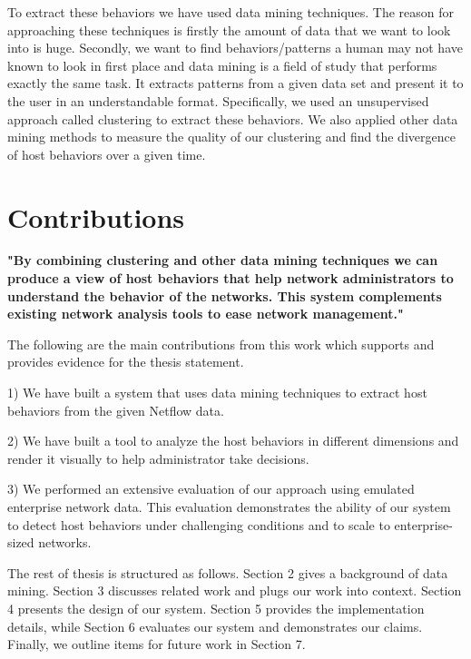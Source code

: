 To extract these behaviors we have used data mining techniques. The reason for approaching these techniques is firstly the amount of data that we want to look into is huge. Secondly, we want to find behaviors/patterns a human may not have known to look in first place and data mining is a field of study that performs exactly the same task. It extracts patterns from a given data set and present it to the user in an understandable format. Specifically, we used an unsupervised approach called clustering to extract these behaviors. We also applied other data mining methods to measure the quality of our clustering and find the divergence of host behaviors over a given time.  


\section{Contributions} \label{contributions}
\textbf{"By combining clustering and other data mining techniques we can produce a view of host behaviors that help network administrators to understand the behavior of the networks. This system complements existing network analysis tools to ease network management."}

The following are the main contributions from this work which supports and provides evidence for the thesis statement.

1) We have built a system that uses data mining techniques to extract host behaviors from the given Netflow data.

2) We have built a tool to analyze the host behaviors in different dimensions and render it visually to help administrator take decisions.

3) We performed an extensive evaluation of our approach using
emulated enterprise network data. This evaluation
demonstrates the ability of our system to detect host behaviors under challenging conditions and to scale to enterprise-sized networks.


The rest of thesis is structured as follows. Section 2 gives a background of data mining. Section 3 discusses related work and plugs our work into context. Section 4 presents the design of our system. Section 5 provides the implementation details, while  Section 6 evaluates our system  and demonstrates our claims. Finally, we outline items for future work in Section 7.

